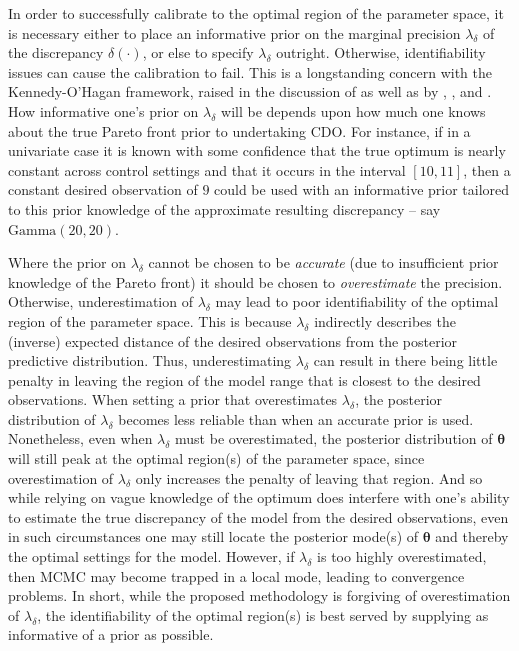 \documentclass[12pt]{article}
\begin{document}
%
In order to successfully calibrate to the optimal region of the parameter space, it is necessary either to place an informative prior on the marginal precision $\lambda_\delta$ of the discrepancy $\delta(\cdot)$, or else to specify $\lambda_\delta$ outright. 
%
Otherwise, identifiability issues can cause the calibration to fail.
%
This is a longstanding concern with the Kennedy-O'Hagan framework, raised in the discussion of \cite{Kennedy2001} as well as by \cite{Bayarri2007}, \cite{Tuo2015}, and \cite{Plumlee2017}.
%
How informative one's prior on $\lambda_\delta$ will be depends upon how much one knows about the true Pareto front prior to undertaking CDO.
%
For instance, if in a univariate case it is known with some confidence that the true optimum is nearly constant across control settings and that it occurs in the interval $[10,11]$, then a constant desired observation of $9$ could be used with an informative prior tailored to this prior knowledge of the approximate resulting discrepancy -- say $\mathrm{Gamma}(20,20)$.
%

Where the prior on $\lambda_\delta$ cannot be chosen to be \emph{accurate} (due to insufficient prior knowledge of the Pareto front) it should be chosen to \emph{overestimate} the precision.
%
Otherwise, underestimation of $\lambda_\delta$ may lead to poor identifiability of the optimal region of the parameter space.
%
This is because $\lambda_\delta$ indirectly describes the (inverse) expected distance of the desired observations from the posterior predictive distribution.
%
Thus, underestimating $\lambda_\delta$ can result in there being little penalty in leaving the region of the model range that is closest to the desired observations.
%
When setting a prior that overestimates $\lambda_\delta$, the posterior distribution of $\lambda_\delta$ becomes less reliable than when an accurate prior is used.
%
Nonetheless, even when $\lambda_\delta$ must be overestimated, the posterior distribution of $\boldsymbol \theta$ will still peak at the optimal region(s) of the parameter space, since overestimation of $\lambda_\delta$ only increases the penalty of leaving that region.
%
And so while relying on vague knowledge of the optimum does interfere with one's ability to estimate the true discrepancy of the model from the desired observations, even in such circumstances one may still locate the posterior mode(s) of $\boldsymbol \theta$ and thereby the optimal settings for the model.
However, if $\lambda_\delta$ is too highly overestimated, then MCMC may become trapped in a local mode, leading to convergence problems. 
%
In short, while the proposed methodology is forgiving of overestimation of $\lambda_\delta$, the identifiability of the optimal region(s) is best served by supplying as informative of a prior as possible. 
\end{document}
